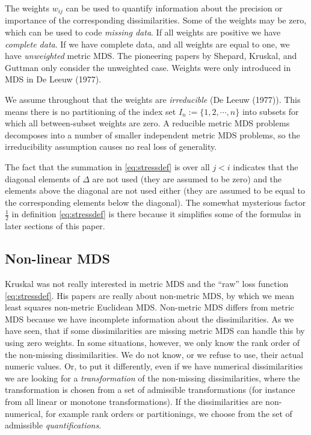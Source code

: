\documentclass[
  12pt,
]{article}
\begin{document}
The weights \(w_{ij}\) can be used to quantify information about the
precision or importance of the corresponding dissimilarities. Some of
the weights may be zero, which can be used to code \emph{missing data}. If
all weights are positive we have \emph{complete data}. If we have complete
data, and all weights are equal to one, we have \emph{unweighted} metric MDS.
The pioneering papers by Shepard, Kruskal, and Guttman only consider the
unweighted case. Weights were only introduced in MDS in De Leeuw (1977).

We assume throughout that the weights are \emph{irreducible} (De Leeuw (1977)).
This means there is no partitioning of the index set
\(I_n:=\{1,2,\cdots,n\}\) into subsets for which all between-subset
weights are zero. A reducible metric MDS problems decomposes into a
number of smaller independent metric MDS problems, so the irreducibility
assumption causes no real loss of generality.

The fact that the summation in \eqref{eq:stressdef} is over all \(j<i\)
indicates that the diagonal elements of \(\Delta\) are not used (they are
assumed to be zero) and the elements above the diagonal are not used either
(they are assumed to be equal to the corresponding elements below
the diagonal). The somewhat mysterious factor \(\frac12\) in definition
\eqref{eq:stressdef} is there because it simplifies some of the formulas
in later sections of this paper.

\subsection{Non-linear MDS}\label{non-linear-mds}

Kruskal was not really interested in metric MDS and the ``raw'' loss
function \eqref{eq:stressdef}. His papers are really about non-metric
MDS, by which we mean least squares non-metric Euclidean MDS. Non-metric
MDS differs from metric MDS because we have incomplete information about
the dissimilarities. As we have seen, that if some dissimilarities are
missing metric MDS can handle this by using zero weights. In some
situations, however, we only know the rank order of the non-missing
dissimilarities. We do not know, or we refuse to use, their actual
numeric values. Or, to put it differently, even if we have numerical
dissimilarities we are looking for a \emph{transformation} of the non-missing
dissimilarities, where the transformation is chosen from a set of
admissible transformations (for instance from all linear or monotone
transformations). If the dissimilarities are non-numerical, for example
rank orders or partitionings, we choose from the set of admissible
\emph{quantifications}.
\end{document}

